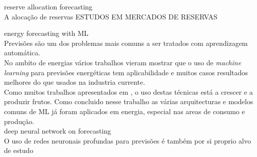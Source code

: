 reserve allocation forecasting \\
A alocação de reservas 
ESTUDOS EM MERCADOS DE RESERVAS \cite{Rassid2017}

energy forecasting with ML \\
Previsões são um dos problemas mais comuns a ser tratados com aprendizagem automática. \cite{} \\
No ambito de energias vários trabalhos vieram mostrar que o uso de \textit{machine learning} para previsões energéticas tem aplicabilidade \cite{Stassen} e muitos casos resultados melhores do que usados na industria currente. \cite{Ahmad2020} \cite{Antonopoulos2020} \\  
Como muitos trabalhos apresentados em \cite{Benti2023}, o uso destas técnicas está a crescer e a produzir frutos. Como concluido nesse trabalho as várias arquitecturas e modelos comuns de ML já foram aplicados em energia, especial nas areas de consumo e produção. \\



deep neural network on forecasting\\
O uso de redes neuronais profundas para previsões é também por si proprio alvo de estudo
\cite{miota2023}






